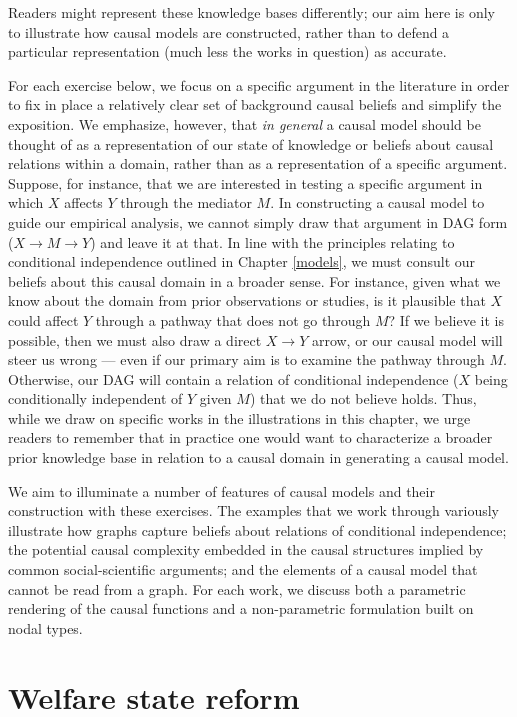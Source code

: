 \documentclass[
  12pt,
]{book}
\begin{document}
Readers might represent these knowledge bases differently; our aim here is only to illustrate how causal models are constructed, rather than to defend a particular representation (much less the works in question) as accurate.

For each exercise below, we focus on a specific argument in the literature in order to fix in place a relatively clear set of background causal beliefs and simplify the exposition. We emphasize, however, that \emph{in general} a causal model should be thought of as a representation of our state of knowledge or beliefs about causal relations within a domain, rather than as a representation of a specific argument. Suppose, for instance, that we are interested in testing a specific argument in which \(X\) affects \(Y\) through the mediator \(M\). In constructing a causal model to guide our empirical analysis, we cannot simply draw that argument in DAG form (\(X \rightarrow M \rightarrow Y\)) and leave it at that. In line with the principles relating to conditional independence outlined in Chapter \ref{models}, we must consult our beliefs about this causal domain in a broader sense. For instance, given what we know about the domain from prior observations or studies, is it plausible that \(X\) could affect \(Y\) through a pathway that does not go through \(M\)? If we believe it is possible, then we must also draw a direct \(X \rightarrow Y\) arrow, or our causal model will steer us wrong --- even if our primary aim is to examine the pathway through \(M\). Otherwise, our DAG will contain a relation of conditional independence (\(X\) being conditionally independent of \(Y\) given \(M\)) that we do not believe holds. Thus, while we draw on specific works in the illustrations in this chapter, we urge readers to remember that in practice one would want to characterize a broader prior knowledge base in relation to a causal domain in generating a causal model.

We aim to illuminate a number of features of causal models and their construction with these exercises. The examples that we work through variously illustrate how graphs capture beliefs about relations of conditional independence; the potential causal complexity embedded in the causal structures implied by common social-scientific arguments; and the elements of a causal model that cannot be read from a graph. For each work, we discuss both a parametric rendering of the causal functions and a non-parametric formulation built on nodal types.

\hypertarget{welfare-state-reform}{%
\section{Welfare state reform}\label{welfare-state-reform}}
\end{document}

